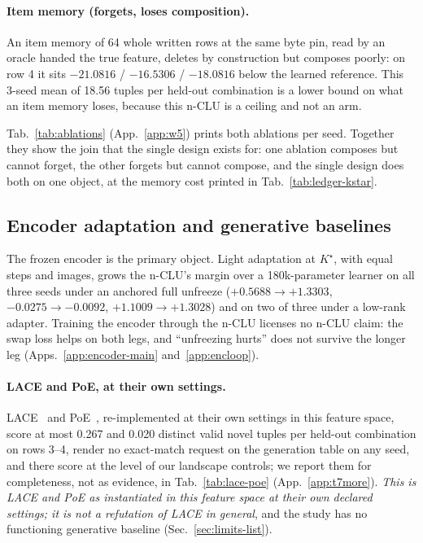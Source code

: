 \documentclass{article} %
\newcommand{\Kstar}{\ensuremath{K^{\star}}}
\begin{document}
\paragraph{Item memory (forgets, loses composition).} An item memory of 64 whole written rows at
the same byte pin, read by an oracle handed the true feature, deletes by construction but
composes poorly: on row 4 it sits $-21.0816$ / $-16.5306$ / $-18.0816$ below the learned
reference. This 3-seed mean of 18.56 tuples per held-out combination is a lower bound on what an item memory
loses, because this n-CLU is a ceiling and not an arm. %

Tab.~\ref{tab:ablations} (App.~\ref{app:w5}) prints both ablations per seed. Together they
show the join that the single design exists for: one ablation composes but cannot forget, the
other forgets but cannot compose, and the single design does both on one object, at the memory
cost printed in Tab.~\ref{tab:ledger-kstar}.

\subsection{Encoder adaptation and generative baselines}
\label{sec:adapt}\label{sec:bard}

The frozen encoder is the primary object. Light adaptation at $\Kstar$, with equal steps and
images, grows the n-CLU's margin over a 180k-parameter learner on all three seeds under an
anchored full unfreeze ($+0.5688\to+1.3303$, $-0.0275\to-0.0092$, $+1.1009\to+1.3028$) and on two
of three under a low-rank adapter. %
Training the encoder through the n-CLU licenses no n-CLU claim: the swap loss helps on both legs,
and ``unfreezing hurts'' does not survive the longer leg (Apps.~\ref{app:encoder-main}
and~\ref{app:encloop}).

\paragraph{LACE and PoE, at their own settings.}
LACE~\citep{nie_controllable_2021} and PoE~\citep{hinton_training_2002}, re-implemented at their own
settings in this feature space, score at most 0.267 and 0.020 distinct valid novel tuples per held-out combination %
on rows 3--4, render no exact-match request on the generation table on any seed, and there score at
the level of our landscape controls; we report them for completeness, not as evidence, in
Tab.~\ref{tab:lace-poe} (App.~\ref{app:t7more}). \emph{This is LACE and PoE as instantiated in
this feature space at their own declared settings; it is not a refutation of LACE in general}, and
the study has no functioning generative baseline (Sec.~\ref{sec:limits-list}).
\end{document}
